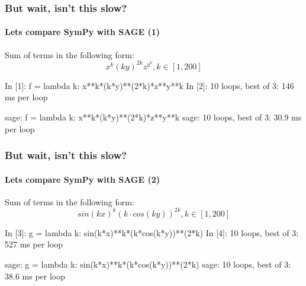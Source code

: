 \documentclass[handout]{beamer}
\begin{document}
\begin{frame}[fragile]
    \frametitle{But wait, isn't this slow?}
    \framesubtitle{Lets compare SymPy with SAGE (1)}

    Sum of terms in the following form:
    \begin{equation*}
    x^k (k y)^{2 k} z^{y^k}, k \in [1,200]
    \end{equation*}

    \begin{python}
In [1]: f = lambda k: x**k*(k*y)**(2*k)*z**y**k
In [2]: %
10 loops, best of 3: 146 ms per loop
    \end{python}

    \begin{python}
sage: f = lambda k: x**k*(k*y)**(2*k)*z**y**k
sage: %
10 loops, best of 3: 30.9 ms per loop
    \end{python}
\end{frame}

\begin{frame}[fragile]
    \frametitle{But wait, isn't this slow?}
    \framesubtitle{Lets compare SymPy with SAGE (2)}

    Sum of terms in the following form:
    \begin{equation*}
    sin(k x)^k (k \cdot cos(k y))^{2 k}, k \in [1,200]
    \end{equation*}

    \begin{python}
In [3]: g = lambda k: sin(k*x)**k*(k*cos(k*y))**(2*k)
In [4]: %
10 loops, best of 3: 527 ms per loop
    \end{python}

    \begin{python}
sage: g = lambda k: sin(k*x)**k*(k*cos(k*y))**(2*k)
sage: %
10 loops, best of 3: 38.6 ms per loop
    \end{python}
\end{frame}
\end{document}
